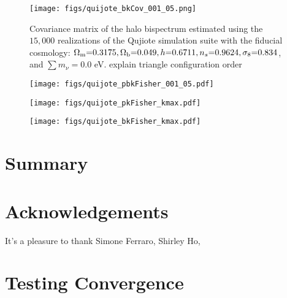 \documentclass[12pt, letterpaper, preprint]{aastex62}
\newcommand{\Om}{\Omega_{\rm m}}
\newcommand{\Ob}{\Omega_{\rm b}}
\newcommand{\smnu}{\sum m_\nu}
\newcommand{\sig}{\sigma_8}
\newcommand{\ch}[1]{{\color{orange}{\bf CH:} #1}}
\begin{document}
\begin{figure}
\begin{center}
    \texttt{[image: figs/quijote\_bkCov\_001\_05.png]} 
    \caption{Covariance matrix of the halo bispectrum estimated using the 
    $15,000$ realizations of the Qujiote simulation suite with the fiducial
    cosmology: $\Om{=}0.3175, \Ob{=}0.049, h{=}0.6711, n_s{=}0.9624, \sig{=}0.834$, 
    and $\smnu{=}0.0$ eV. \ch{explain triangle configuration order} 
    }
\label{fig:bk_cov}
\end{center}
\end{figure}

\begin{figure}
\begin{center}
    \texttt{[image: figs/quijote\_pbkFisher\_001\_05.pdf]}
    \caption{}
\label{fig:bk_fish}
\end{center}
\end{figure}


\begin{figure}
\begin{center}
    \texttt{[image: figs/quijote\_pkFisher\_kmax.pdf]} 
    \caption{}
\label{fig:pk_fish_kmax}
\end{center}
\end{figure}


\begin{figure}
\begin{center}
    \texttt{[image: figs/quijote\_bkFisher\_kmax.pdf]} 
    \caption{}
\label{fig:bk_fish_kmax}
\end{center}
\end{figure}

\section{Summary} 


\section*{Acknowledgements}
It's a pleasure to thank 
    Simone Ferraro, 
    Shirley Ho, 

\appendix
\section{Testing Convergence} 
%
\end{document}
